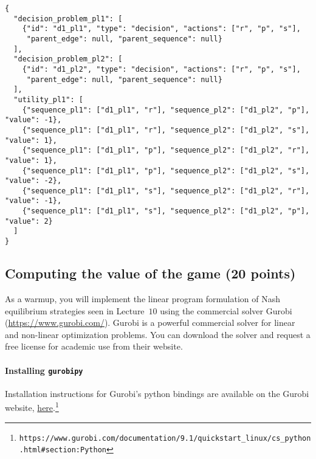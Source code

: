 \documentclass{homework}
\begin{document}
{\small\begin{verbatim}
{
  "decision_problem_pl1": [
    {"id": "d1_pl1", "type": "decision", "actions": ["r", "p", "s"],
     "parent_edge": null, "parent_sequence": null}
  ],
  "decision_problem_pl2": [
    {"id": "d1_pl2", "type": "decision", "actions": ["r", "p", "s"],
     "parent_edge": null, "parent_sequence": null}
  ],
  "utility_pl1": [
    {"sequence_pl1": ["d1_pl1", "r"], "sequence_pl2": ["d1_pl2", "p"], "value": -1},
    {"sequence_pl1": ["d1_pl1", "r"], "sequence_pl2": ["d1_pl2", "s"], "value": 1},
    {"sequence_pl1": ["d1_pl1", "p"], "sequence_pl2": ["d1_pl2", "r"], "value": 1},
    {"sequence_pl1": ["d1_pl1", "p"], "sequence_pl2": ["d1_pl2", "s"], "value": -2},
    {"sequence_pl1": ["d1_pl1", "s"], "sequence_pl2": ["d1_pl2", "r"], "value": -1},
    {"sequence_pl1": ["d1_pl1", "s"], "sequence_pl2": ["d1_pl2", "p"], "value": 2}
  ]
}
\end{verbatim}}

\subsection{Computing the value of the game (20 points)}

As a warmup, you will implement the linear program formulation of Nash equilibrium strategies seen in Lecture~$10$ using the commercial solver Gurobi (\url{https://www.gurobi.com/}). Gurobi is a powerful commercial solver for linear and non-linear optimization problems. You can download the solver and request a free license for academic use from their website.

\paragraph{Installing \texttt{gurobipy}}
Installation instructions for Gurobi's python bindings are available on the Gurobi website, \href{https://www.gurobi.com/documentation/9.1/quickstart_linux/cs_python.html#section:Python}{here}.\footnote{\texttt{https://www.gurobi.com/documentation/9.1/quickstart\_linux/cs\_python.html\#section:Python}}
\end{document}

